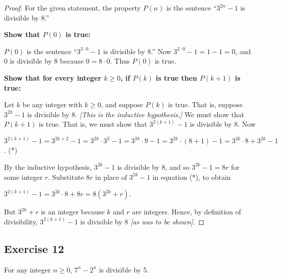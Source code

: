 \documentclass[14pt]{extarticle}
\begin{document}
\begin{proof}
    For the given statement, the property $P(n)$ is the sentence “$3^{2n} - 1$ is divisible by 8.”

    {\bf Show that $P(0)$ is true:}

    $P(0)$ is the sentence “$3^{2 \cdot 0} - 1$ is divisible by 8.” Now $3^{2 \cdot 0} - 1 = 1 - 1 = 0$, and 0 is divisible by 8 because $0 = 8 \cdot 0$. Thus $P(0)$ is true.

        {\bf Show that for every integer $k \geq 0$, if $P(k)$ is true then $P(k + 1)$ is true:}

    Let $k$ be any integer with $k \geq 0$, and suppose $P(k)$ is true. That is, suppose $3^{2k} - 1$ is divisible by 8. {\it [This is the inductive hypothesis.]} We must show that $P(k + 1)$ is true. That is, we must show that $3^{2(k+1)} - 1$ is divisible by 8. Now

    $3^{2(k+1)} - 1 = 3^{2k+2} - 1 = 3^{2k} \cdot 3^2 - 1 = 3^{2k} \cdot 9 - 1 = 3^{2k} \cdot (8+1) - 1 = 3^{2k} \cdot 8 + 3^{2k} - 1$. (*)

    By the inductive hypothesis, $3^{2k} - 1$ is divisible by 8, and so $3^{2k} - 1 = 8r$ for some integer $r$. Substitute $8r$ in place of $3^{2k} - 1$ in equation (*), to obtain

    $3^{2(k+1)} - 1 = 3^{2k} \cdot 8 + 8r = 8(3^{2k} + r)$.

    But $3^{2k} + r$ is an integer because $k$ and $r$ are integers. Hence, by definition of divisibility, $3^{2(k+1)} - 1$ is divisible by 8 {\it [as was to be shown]}.
\end{proof}

\subsection{Exercise 12}
For any integer $n \geq 0$, $7^n - 2^n$ is divisible by 5.
\end{document}
